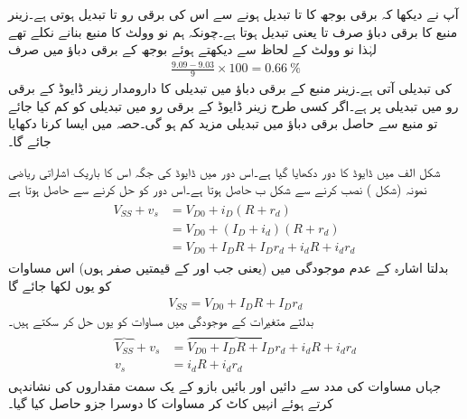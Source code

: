 آپ نے دیکھا کہ برقی بوجھ کا  تا  تبدیل ہونے سے اس کی برقی رو  تا   تبدیل ہوتی ہے۔زینر منبع کا برقی دباؤ صرف  تا  یعنی  تبدیل ہوتا ہے۔چونکہ ہم نو وولٹ کا منبع بنانے نکلے تھے لہٰذا نو وولٹ کے لحاظ سے دیکھتے ہوئے بوجھ کے برقی دباؤ  میں صرف
\begin{align*}
\frac{9.09-9.03}{9} \times 100=\SI{0.66}{\percent}
\end{align*}
کی تبدیلی آتی ہے۔زینر منبع کے برقی دباؤ میں تبدیلی کا دارومدار زینر ڈایوڈ کے برقی رو میں تبدیلی پر ہے۔اگر کسی طرح زینر ڈایوڈ کے برقی رو میں تبدیلی کو کم کیا جائے تو منبع سے حاصل برقی دباؤ میں تبدیلی مزید کم ہو گی۔حصہ  میں ایسا کرنا دکھایا جائے گا۔

شکل  الف میں ڈایوڈ کا دور دکھایا گیا ہے۔اس دور میں ڈایوڈ کی جگہ اس کا باریک اشاراتی ریاضی نمونہ (شکل 
  ) نصب کرنے سے شکل  ب حاصل ہوتا ہے۔اس دور کو حل کرنے سے حاصل ہوتا ہے
\begin{gather} \label{مساوات_ڈایوڈ_اشارہ_موجود}
\begin{aligned}
V_{SS}+v_s&=V_{D0}+i_D (R+r_d )\\
&=V_{D0}+(I_D+i_d)(R+r_d)\\
&=V_{D0}+I_D R + I_D r_d + i_d R + i_d r_d\
\end{aligned}
\end{gather}
بدلتا اشارہ کے عدم موجودگی میں (یعنی جب   اور  کے قیمتیں صفر ہوں) اس مساوات کو یوں لکھا جائے گا
\begin{align} \label{مساوات_ڈایوڈ_اشارہ_عدم_موجود}
V_{SS}=V_{D0}+I_D R +I_D r_d
\end{align}
بدلتے متغیرات کے موجودگی میں مساوات   کو یوں حل کر سکتے ہیں۔
\begin{gather} \label{مساوات_ڈایوڈ_باریک_اشاراتی_مساوات}
\begin{aligned}
\overbrace{V_{SS}}+v_s &=\overbrace{V_{D0}+I_D R + I_D r_d}+i_d R + i_d r_d\\
v_s &= i_d R + i_d r_d
\end{aligned}
\end{gather}
جہاں مساوات   کی مدد سے دائیں اور بائیں بازو کے یک سمت مقداروں کی نشاندہی کرتے ہوئے انہیں کاٹ کر مساوات کا دوسرا جزو حاصل کیا گیا۔

